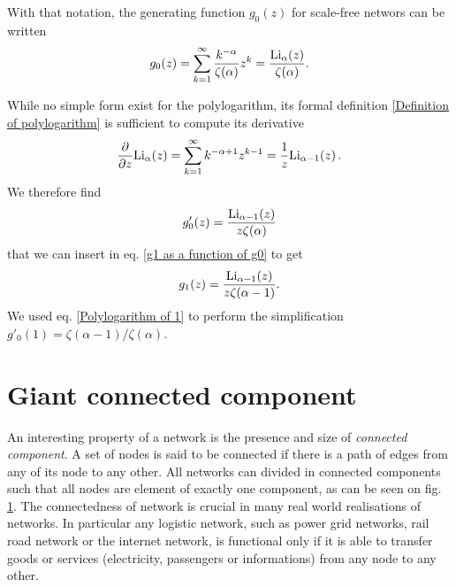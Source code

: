 \documentclass[
11pt, %
english, %
singlespacing, %
liststotoc, %
headsepline, %
]{MastersDoctoralThesis} %
\begin{document}
With that notation, the generating function $g_0(z)$ for scale-free networs can be written
\begin{align}
	g_0(z) = \sum_{k=1}^\infty \frac{k^{-\alpha}}{\zeta(\alpha)} z^k = \frac{\mathrm{Li}_{\alpha}\!\left(z\right)}{\zeta(\alpha)}. \label{Generating function for scale free networks}
\end{align}

While no simple form exist for the polylogarithm, its formal definition \eqref{Definition of polylogarithm} is sufficient to compute its derivative
\begin{align}
	\frac{\partial}{\partial z} \mathrm{Li}_{\alpha}\!\left(z\right) = \sum_{k = 1}^\infty k^{-\alpha + 1} z^{k-1} = \frac{1}{z} \mathrm{Li}_{\alpha - 1}\!\left(z\right). \label{Derivative of the polylogarithm}
\end{align}
We therefore find
\begin{align}
	g'_0(z) = \frac{\mathrm{Li}_{\alpha - 1}\!\left(z\right)}{z \zeta(\alpha)}  \label{Derivative of g0 for scale free networks}
\end{align}
that we can insert in eq. \eqref{g1 as a function of g0} to get
\begin{align}
	g_1(z) =  \frac{\mathrm{Li}_{\alpha - 1}\!\left(z\right)}{z \zeta(\alpha - 1)}.
\end{align}
We used eq. \eqref{Polylogarithm of 1} to perform the simplification $g'_0(1) = \zeta(\alpha - 1)/\zeta(\alpha)$.


\section{Giant connected component}
\label{Section: Giant connected component}

An interesting property of a network is the presence and size of \emph{connected component}. A set of nodes is said to be connected if there is a path of edges from any of its node to any other. All networks can divided in connected components such that all nodes are element of exactly one component, as can be seen on fig. \ref{Figure: Connected components}. The connectedness of network is crucial in many real world realisations of networks. In particular any logistic network, such as power grid networks, rail road network or the internet network, is functional only if it is able to transfer goods or services (electricity, passengers or informations) from any node to any other.

\begin{figure}
	\caption{}
	\label{Figure: Connected components}
\end{figure}
\end{document}
